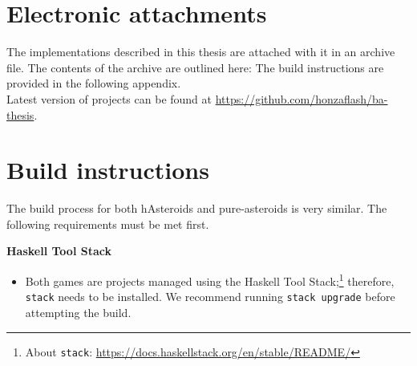 \documentclass[
  digital, %
  color,   %
  table,   %
  oneside, %
  lof,     %
  lot,     %
]{fithesis3}
\begin{document}
{%
\printbibliography[heading=bibintoc] %






\appendix %



\chapter{Electronic attachments}
\label{app:attach}

The implementations described in this thesis are attached with it
in an archive file. The contents of the archive are outlined here:
\medskip
{}
\medskip
\noindent The build instructions are provided in the following appendix.\\
Latest version of projects can be found at \url{https://github.com/honzaflash/ba-thesis}.


\chapter{Build instructions}
The build process for both hAsteroids and pure-asteroids is very similar.
The following requirements must be met first.
\newcommand{\requirementitem}[1]{\noindent\textbf{#1}}

\medskip
\requirementitem{Haskell Tool Stack}
\begin{itemize}[\indent]
    \item Both games are projects managed using the Haskell Tool Stack;\footnote{
    About \texttt{stack}: \url{https://docs.haskellstack.org/en/stable/README/}
    } therefore, \texttt{stack} needs to be installed.
    We recommend running \texttt{stack upgrade} before attempting the build.
\end{itemize}

}
\end{document}
